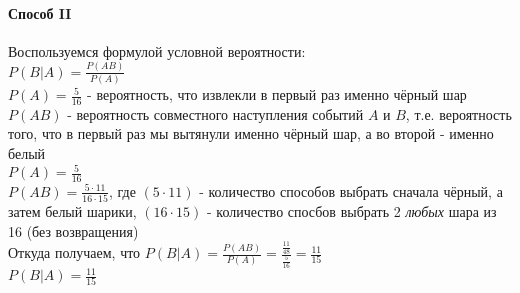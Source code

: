 \documentclass[12pt]{article}
\begin{document}
			\paragraph*{Способ II}
				Воспользуемся формулой условной вероятности: \\
				$P(B|A) = \frac{P(AB)}{P(A)}$ \\
				$P(A) = \frac{5}{16}$ - вероятность, что извлекли в первый раз именно чёрный шар\\
				$P(AB)$ - вероятность совместного наступления событий $A$ и $B$, т.е. вероятность того, что в первый раз мы вытянули именно чёрный шар, а во второй - именно белый \\
				$P(A) = \frac{5}{16}$ \\
				$P(AB) = \frac{5\cdot 11}{16\cdot 15}$, где $(5 \cdot 11)$ - количество способов выбрать сначала чёрный, а затем белый шарики, $(16 \cdot 15)$ - количество спосбов выбрать 2 \textit{любых} шара из 16 (без возвращения)\\
				Откуда получаем, что $P(B|A) = \frac{P(AB)}{P(A)} = \frac{\frac{11}{48}}{\frac{5}{16}} = \frac{11}{15}$ \\
				\underline{$P(B|A) = \frac{11}{15}$}\\
				\newline
\end{document}
